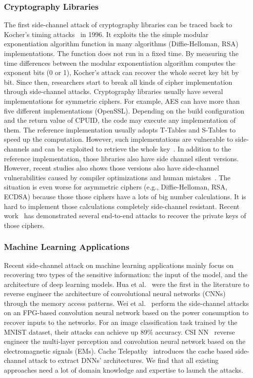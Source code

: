 \subsubsection{Cryptography Libraries}
The first side-channel attack of cryptography libraries can be traced back to Kocher's timing attacks~\cite{kocher1996timing} in 1996. It exploits the the simple modular exponentiation algorithm function in many algorithms (Diffie-Helloman, RSA) implementations. The function does not run in a fixed time. By measuring the time differences between the modular exponentiation algorithm computes the exponent bits (0 or 1), Kocher's attack can recover the whole secret key bit by bit. Since then, researchers start to break all kinds of cipher implementation through side-channel attacks.   Cryptography libraries usually have several implementations for symmetric ciphers.
For example, AES can have more than five different implementations (OpenSSL). Depending on the build configuration and the return value of \textsf{CPUID}, the code may execute any implementation of them. The reference implementation usually adopts T-Tables and S-Tables to speed up the computation. However, such implementations are vulnerable to side-channels and can be exploited to retrieve the whole key~\cite{bonneau2006cache}. In addition to the reference implementation, those libraries also have side channel silent versions. However, recent studies also shows those versions also have side-channel vulnerabilities caused by compiler optimizations and human mistakes~\cite{217537}. The situation is even worse for asymmetric ciphers (e.g., Diffie-Helloman, RSA, ECDSA) because those those ciphers have a lots of big number calculations. It is hard to implement those calculations completely side-channel resistant. Recent work~\cite{arnaud2013timing,yarom2017cachebleed,yarom2014flush+} has demonstrated several end-to-end attacks to recover the private keys of those ciphers.
\subsubsection{Machine Learning Applications}
Recent side-channel attack on machine learning applications mainly focus on recovering two types of the sensitive information: the input of the model, and the architecture of deep learning models. Hua et al.~\cite{hua2018reverse} were the first in the literature to reverse engineer the architecture of convolutional neural networks (CNNs) through the memory access patterns. Wei et al.~\cite{wei2018know} perform the side-channel attacks on an FPG-based convolution neural network based on the power consumption to recover inputs to the networks. For an image classification task trained by the MNIST dataset, their attacks can achieve up 89\% accuracy. CSI NN~\cite{batina2019csi} reverse engineer the multi-layer perception and convolution neural network based on the electromagnetic signals (EMs). Cache Telepathy~\cite{yan2020cache} introduces the cache based side-channel attack to extract DNNs' architectures. We find that all existing approaches need a lot of domain knowledge and expertise to launch the attacks.
